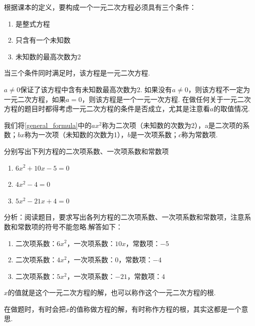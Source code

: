 \documentclass[lang=cn, 10pt, titlestyle=hang, oneside]{elegantbook}
\begin{document}
根据课本的定义，要构成一个一元二次方程必须具有三个条件：
\begin{enumerate}
    \item 是整式方程
    \item 只含有一个未知数
    \item 未知数的最高次数为2
\end{enumerate}
\par
当三个条件同时满足时，该方程是一元二次方程.\\
\begin{remark}
    \(a\ne 0\)保证了该方程中含有未知数最高次数为2. 如果没有\(a\ne 0\)，则该方程不一定为一元二次方程，如果\(a= 0\)，则该方程是一个一元一次方程. 在做任何关于一元二次方程的题目时都得考虑一元二次方程的条件是否成立，尤其是注意看\(a\)的取值情况.
\end{remark}
\par
我们将\eqref{general_formula}中的$ax^2$称为二次项（未知数的次数为2），a是二次项的系数；$bx$称为一次项（未知数的次数为1），$b$是一次项系数；$c$称为常数项.
\par
\begin{example}
    分别写出下列方程的二次项系数、一次项系数和常数项
    \begin{enumerate}
        \item \( 6x^2+10x-5=0 \)
        \item \( 4x^2-4=0 \)
        \item \( 5x^2-21x+4=0 \)
    \end{enumerate}
\end{example}
\par
\begin{solution}
    分析：阅读题目，要求写出各列方程的二次项系数、一次项系数和常数项，注意系数和常数项的符号不能忽略.解答如下：
    \begin{enumerate}
        \item  二次项系数：\(6x^2\)，一次项系数：\(10x\)，常数项：\(-5\)
        \item  二次项系数：\(4x^2\)，一次项系数：\(0\)，常数项：\(-4\)
        \item  二次项系数：\(5x^2\)，一次项系数：\(-21\)，常数项：\(4\)
    \end{enumerate}
\end{solution}
$x$的值就是这个一元二次方程的解，也可以称作这个一元二次方程的根.
\begin{remark}
    在做题时，有时会把$x$的值称做方程的解，有时称作方程的根，其实这都是一个意思.
\end{remark}
\end{document}
